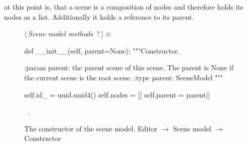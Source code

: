 \documentclass[%
    a4paper,    %
    justified,  %
    nobib,      %
    openany     %
]{tufte-book}
\begin{document}
 at this point is, that a scene is a composition
of nodes and therefore holds its nodes as a list. Additionally it holds a
reference to its parent.

\begin{figure}
\begin{flushleft} \small
\begin{minipage}{\linewidth}\label{scrap22}\raggedright\small
{} $\langle\,${\itshape Scene model methods}\nobreak\ {\footnotesize {?}}$\,\rangle\equiv$
\vspace{-1ex}
\begin{pythoncode}
def __init__(self, parent=None):
    """Constructor.

    :param parent: the parent scene of this scene. The parent is
                   None if the current scene is the root scene.
    :type parent:  SceneModel
    """

    self.id_ = uuid.uuid4()
    self.nodes = []
    self.parent = parent|\NWsep|
\end{pythoncode}
\vspace{1.5ex}
\footnotesize
\begin{list}{}{\setlength{\itemsep}{-\parsep}\setlength{\itemindent}{-\leftmargin}}
\item \NWtxtMacroRefIn\ .

\item{}
\end{list}
\end{minipage}\vspace{4ex}
\end{flushleft}
\caption{The constructor of the scene model.
  \newline{}\newline{}Editor $\rightarrow$ Scene model $\rightarrow$ Constructor}
\label{editor:lst:scene-model:constructor}
\end{figure}
\end{document}
